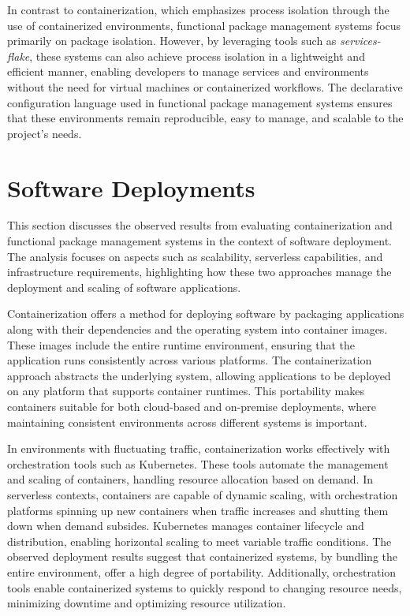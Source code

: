 In contrast to containerization, which emphasizes process isolation through the use of
containerized environments, functional package management systems focus primarily on package
isolation. However, by leveraging tools such as \textit{services-flake}, these systems can
also achieve process isolation in a lightweight and efficient manner, enabling developers to
manage services and environments without the need for virtual machines or containerized
workflows. The declarative configuration language used in functional package management
systems ensures that these environments remain reproducible, easy to manage, and scalable
to the project’s needs.

\section{Software Deployments}
This section discusses the observed results from evaluating containerization and functional
package management systems in the context of software deployment. The analysis focuses on
aspects such as scalability, serverless capabilities, and infrastructure requirements,
highlighting how these two approaches manage the deployment and scaling of software applications.

Containerization offers a method for deploying software by packaging applications along
with their dependencies and the operating system into container images. These images include
the entire runtime environment, ensuring that the application runs consistently across various
platforms. The containerization approach abstracts the underlying system, allowing
applications to be deployed on any platform that supports container runtimes. This portability
makes containers suitable for both cloud-based and on-premise deployments, where maintaining
consistent environments across different systems is important.

In environments with fluctuating traffic, containerization works effectively with orchestration
tools such as Kubernetes. These tools automate the management and scaling of containers,
handling resource allocation based on demand. In serverless contexts, containers are capable
of dynamic scaling, with orchestration platforms spinning up new containers when traffic
increases and shutting them down when demand subsides. Kubernetes manages container lifecycle
and distribution, enabling horizontal scaling to meet variable traffic conditions. The observed
deployment results suggest that containerized systems, by bundling the entire environment,
offer a high degree of portability. Additionally, orchestration tools enable containerized
systems to quickly respond to changing resource needs, minimizing downtime and optimizing
resource utilization.

